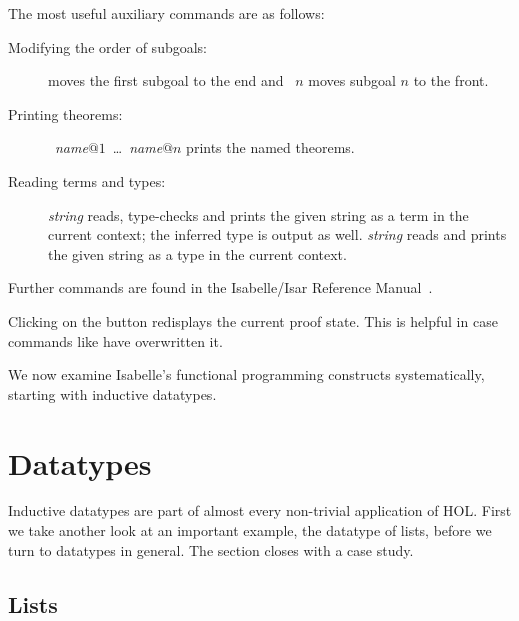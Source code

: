 The most useful auxiliary commands are as follows:
\begin{description}
\item[Modifying the order of subgoals:]
 moves the first subgoal to the end and
~$n$ moves subgoal $n$ to the front.
\item[Printing theorems:]
  ~\textit{name}$@1$~\dots~\textit{name}$@n$
  prints the named theorems.
\item[Reading terms and types:] 
  \textit{string} reads, type-checks and prints the given string as a term in
  the current context; the inferred type is output as well.
   \textit{string} reads and prints the given
  string as a type in the current context.
\end{description}
Further commands are found in the Isabelle/Isar Reference
Manual~\cite{isabelle-isar-ref}.

\begin{pgnote}
Clicking on the  button redisplays the current proof state.
This is helpful in case commands like  have overwritten it.
\end{pgnote}

We now examine Isabelle's functional programming constructs systematically,
starting with inductive datatypes.


\section{Datatypes}
\label{sec:datatype}

%
Inductive datatypes are part of almost every non-trivial application of HOL.
First we take another look at an important example, the datatype of
lists, before we turn to datatypes in general. The section closes with a
case study.


\subsection{Lists}

